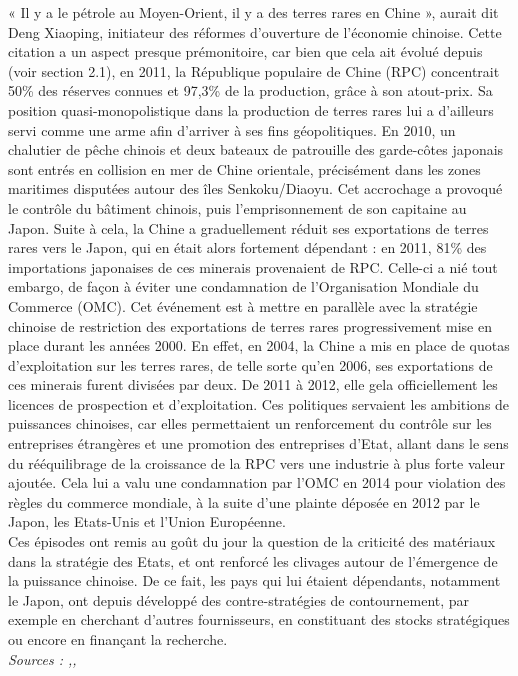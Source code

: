 \begin{center}
{{\begin{minipage}{14cm}
    
« Il y a le pétrole au Moyen-Orient, il y a des terres rares en Chine », aurait dit Deng Xiaoping, initiateur des réformes d’ouverture de l’économie chinoise. Cette citation a un aspect presque prémonitoire, car bien que cela ait évolué depuis (voir section 2.1), en 2011, la République populaire de Chine (RPC) concentrait 50\% des réserves connues et 97,3\% de la production, grâce à son atout-prix. Sa position quasi-monopolistique dans la production de terres rares lui a d’ailleurs servi comme une arme afin d’arriver à ses fins géopolitiques.  \smallbreak
En 2010, un chalutier de pêche chinois et deux bateaux de patrouille des garde-côtes japonais sont entrés en collision en mer de Chine orientale, précisément dans les zones maritimes disputées autour des îles Senkoku/Diaoyu. Cet accrochage a provoqué le contrôle du bâtiment chinois, puis l’emprisonnement de son capitaine au Japon. Suite à cela, la Chine a graduellement réduit ses exportations de terres rares vers le Japon, qui en était alors fortement dépendant : en 2011, 81\% des importations japonaises de ces minerais provenaient de RPC. Celle-ci a nié tout embargo, de façon à éviter une condamnation de l’Organisation Mondiale du Commerce (OMC).  \smallbreak
Cet événement est à mettre en parallèle avec la stratégie chinoise de restriction des exportations de terres rares progressivement mise en place durant les années 2000. En effet, en 2004, la Chine a mis en place de quotas d’exploitation sur les terres rares, de telle sorte qu’en 2006, ses exportations de ces minerais furent divisées par deux. De 2011 à 2012, elle gela officiellement les licences de prospection et d’exploitation. Ces politiques servaient les ambitions de puissances chinoises, car elles permettaient un renforcement du contrôle sur les entreprises étrangères et une promotion des entreprises d’Etat, allant dans le sens du rééquilibrage de la croissance de la RPC vers une industrie à plus forte valeur ajoutée. Cela lui a valu une condamnation par l’OMC en 2014 pour violation des règles du commerce mondiale, à la suite d’une plainte déposée en 2012 par le Japon, les Etats-Unis et l’Union Européenne.  \\
Ces épisodes ont remis au goût du jour la question de la criticité des matériaux dans la stratégie des Etats, et ont renforcé les clivages autour de l’émergence de la puissance chinoise. De ce fait, les pays qui lui étaient dépendants, notamment le Japon, ont depuis développé des contre-stratégies de contournement, par exemple en cherchant d’autres fournisseurs, en constituant des stocks stratégiques ou encore en finançant la recherche. 
\\[0.5cm]
\textit{Sources : \cite{niquet_chine_2011},\cite{lincot_terres_2021},\cite{faujas_matieres_2014}}

    \end{minipage}}
    }
\end{center}
\label{Chine}
~\\
